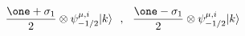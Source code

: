 \begin{equation}
\frac{\one+ \sigma_1}{2} \otimes \psi_{-1/2}^{\mu,i} |k\rangle ~~,~~
\frac{\one - \sigma_1}{2} \otimes \psi_{-1/2}^{\mu,i} |k \rangle
\label{gau54}
\end{equation}


